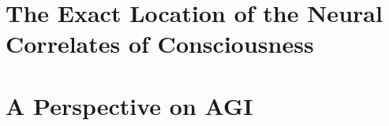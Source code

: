\documentclass[runningheads]{llncs}
\begin{document}
\section{The Exact Location of the Neural Correlates of Consciousness}

\section{A Perspective on AGI}
\end{document}
